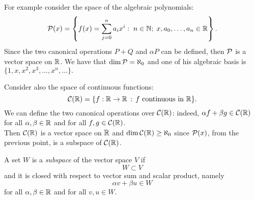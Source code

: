 \begin{exam}
	For example consider the space of the algebraic polynomials:
	$$
	\mathcal P(x)
	= \left\{ 
	f(x) 
	= \sum_{j=0}^n a_i x^i :\;  
	n \in \mathbb N; \; x, a_0, \ldots, a_n \in \mathbb R 
	\right\}
	.
	$$
	Since the two canonical operations $P+Q$ and $\alpha P$ can be defined, then $\mathcal P$ is a vector space on $\mathbb R$. We have that $\dim \mathcal P=\aleph_0$ and one of his algebraic basis is $\{1,x,x^2,x^3,\ldots,x^n,\ldots \}.$
\end{exam}
\begin{exam}
	Consider also the space of continuous functions:
	$$
	\mathcal C(\mathbb R)
	=\{ 
		f: \mathbb R \to \mathbb R \, :\,  
		f \text{ continuous in } \mathbb R
	\}
	.
	$$
	We can define the two canonical operations over $\mathcal C(\mathbb R)$: indeed, $\alpha f + \beta g \in \mathcal C(\mathbb R)$ for all $\alpha, \beta \in \mathbb R$ and for all $f,g \in \mathcal C(\mathbb R)$.\\
	Then $\mathcal C(\mathbb R)$ is a vector space on $\mathbb R$ and $\dim\mathcal C(\mathbb R) \geq \aleph_0$ since $\mathcal P(x)$, from the previous point, is a subspace of $\mathcal C(\mathbb R)$.
	
\end{exam}
	

\begin{defn}
	A set $W$ is a \emph{subspace} of the vector space $V$ if $$W \subset V$$ and it is closed with respect to vector sum and scalar product, namely
	$$\alpha v + \beta u \in W$$ for all $\alpha, \beta \in \mathbb R$ and for all $v, u \in W$.
\end{defn}
